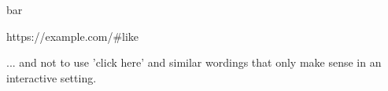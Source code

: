 \begin{multicols}{2}
\begin{mktsEnNotes}{\mktsEnStyleMarkNotes{}\mktsEnMarkAfter{}}bar

{\mktsEnStyleMarkNotes{}\mktsEnMarkAfter{}}{\mktsStyleUrl{}https:\g/\g/\g\allowbreak{}example.com\g/\g\allowbreak{}\#like

}{\mktsEnStyleMarkNotes{}\mktsEnMarkAfter{}}... and not
to use 'click here' and similar wordings that only make sense in an interactive setting.

\end{mktsEnNotes}


\end{multicols}




